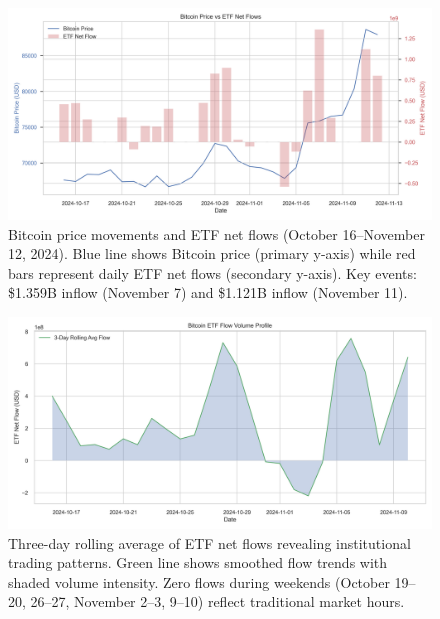 \documentclass{article} %
\begin{document}
\begin{figure}[h]
    \centering
    \includegraphics[width=\textwidth]{price_vs_flows.png}
    \caption{Bitcoin price movements and ETF net flows (October 16--November 12, 2024). Blue line shows Bitcoin price (primary y-axis) while red bars represent daily ETF net flows (secondary y-axis). Key events: \$1.359B inflow (November 7) and \$1.121B inflow (November 11).}
    \label{fig:price_flows}
\end{figure}

\begin{figure}[h]
    \centering
    \includegraphics[width=\textwidth]{volume_profile.png}
    \caption{Three-day rolling average of ETF net flows revealing institutional trading patterns. Green line shows smoothed flow trends with shaded volume intensity. Zero flows during weekends (October 19--20, 26--27, November 2--3, 9--10) reflect traditional market hours.}
    \label{fig:volume_profile}
\end{figure}
\end{document}
